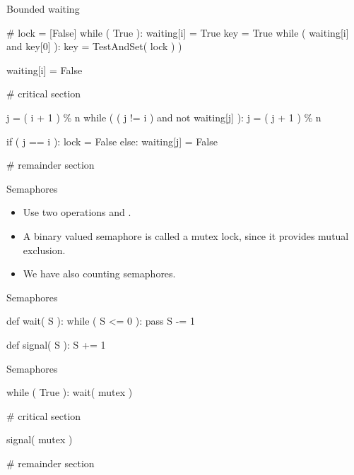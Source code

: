 \documentclass{beamer}
\begin{document}
\begin{frame}{\insertsubsectionhead}{Bounded waiting}
  \begin{source}[language=Python]
# lock = [False]
while ( True ):
  waiting[i] = True
  key = True
  while ( waiting[i] and key[0] ):
    key = TestAndSet( lock ) )

  waiting[i] = False

  # critical section

  j = ( i + 1 ) \% n
  while ( ( j != i ) and not waiting[j] ):
    j = ( j + 1 ) \% n

  if ( j == i ):
    lock = False
  else:
    waiting[j] = False

  # remainder section
  \end{source}
\end{frame}

\begin{frame}[fragile]{\insertsubsectionhead}{Semaphores}
  \begin{itemize}
    \item Use two operations  and .

    \item A binary valued semaphore is called a mutex lock, since it provides 
      mutual exclusion.

    \item We have also counting semaphores.

  \end{itemize}
\end{frame}

\begin{frame}[fragile]{\insertsubsectionhead}{Semaphores}
  \begin{source}[language=Python]
def wait( S ):
  while ( S <= 0 ):
    pass
  S -= 1
  \end{source}
  \begin{source}[language=Python]
def signal( S ):
  S += 1
  \end{source}
\end{frame}

\begin{frame}[fragile]{\insertsubsectionhead}{Semaphores}
  \begin{source}[language=Python]
while ( True ):
  wait( mutex )

  # critical section

  signal( mutex )

  # remainder section
  \end{source}
\end{frame}
\end{document}
